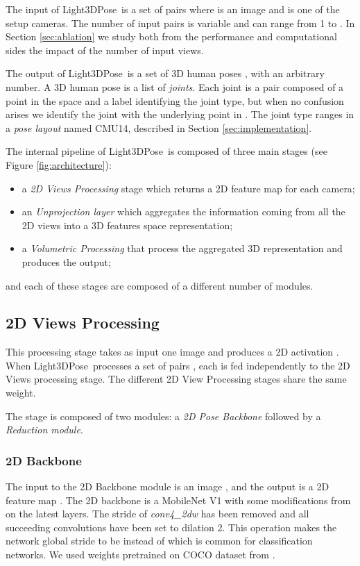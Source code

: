 \documentclass[a4paper,conference]{IEEEtran}
\newcommand{\thename}{Light3DPose}
\begin{document}
The input of \thename\  is a set of pairs 
where  is an image and  is one of the setup cameras.
The number of input pairs  is variable and can range from 1 to .
In Section \ref{sec:ablation} we study both from the performance and 
computational sides the impact of the number of input views.

The output of \thename\  is a set of 3D human poses ,
with  an arbitrary number.
A 3D human pose  is a list  of \emph{joints}.
Each joint is a pair composed of a point in the space  and a label identifying
the joint type, but when no confusion arises we identify the joint with
the underlying point in .
The joint type ranges in a \emph{pose layout} named CMU14, described in Section \ref{sec:implementation}.

The internal pipeline of \thename\  is composed of three main stages (see Figure \ref{fig:architecture}):

\begin{itemize}
    \item a \emph{2D Views Processing} stage which returns a 2D feature map for each camera;
    \item an \emph{Unprojection layer} \cite{iskakov2019learnable} which aggregates the information coming from all the 2D views into a 3D features space representation;
    \item a \emph{Volumetric Processing} that process the aggregated 3D representation and produces the output;
\end{itemize}
and each of these stages are composed of a different number of modules.

\subsection{2D Views Processing}

This processing stage takes as input one image 
and produces a 2D activation .
When \thename\  processes a set
of pairs , each  is fed independently to the 2D Views 
processing stage. The different 2D View Processing stages share the same
weight.

The stage is composed of two modules: a \emph{2D Pose Backbone} followed by a 
\emph{Reduction module}. 

\subsubsection{2D Backbone}

The input to the 2D Backbone module is an image , and the
output is a 2D feature map . The 2D backbone is a MobileNet V1 \cite{howard2017mobilenets} with some modifications from \cite{osokin2018lightweight_openpose} on the latest layers. The stride of \emph{conv4\_2\/dw} has been removed and all succeeding convolutions have been set to dilation 2. This operation makes the network global stride to be  instead of  which is common for classification networks. We used weights pretrained on COCO dataset from \cite{osokin2018lightweight_openpose}.
\end{document}
